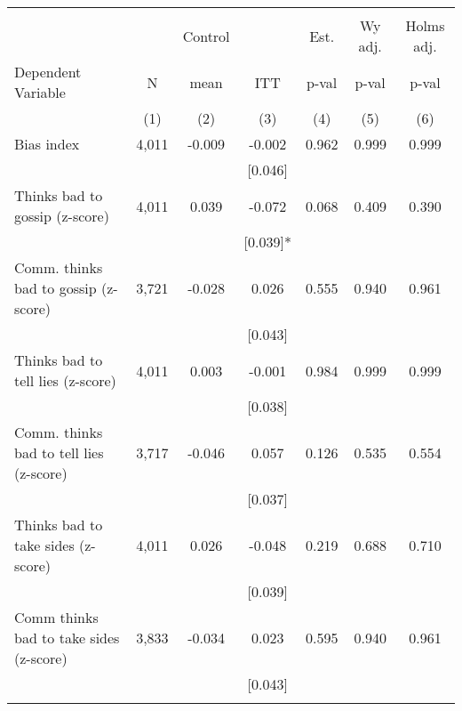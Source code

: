 \begin{tabular}{lcccccc}
\hline \noalign{\smallskip} &  &  &  &  &  & \\
 &  & Control &  & Est. & Wy adj. & Holms adj.\\
Dependent Variable & N & mean & ITT & p-val & p-val & p-val\\
 & (1) & (2) & (3) & (4) & (5) & (6)\\
\noalign{\smallskip}\hline \noalign{\smallskip}\quad Bias index & 4,011 & -0.009 & -0.002 & 0.962 & 0.999 & 0.999\\
 &  &  & [0.046] &  &  & \\
\quad Thinks bad to gossip (z-score) & 4,011 & 0.039 & -0.072 & 0.068 & 0.409 & 0.390\\
 &  &  & [0.039]* &  &  & \\
\quad Comm. thinks bad to gossip (z-score) & 3,721 & -0.028 & 0.026 & 0.555 & 0.940 & 0.961\\
 &  &  & [0.043] &  &  & \\
\quad Thinks bad to tell lies (z-score) & 4,011 & 0.003 & -0.001 & 0.984 & 0.999 & 0.999\\
 &  &  & [0.038] &  &  & \\
\quad Comm. thinks bad to tell lies (z-score) & 3,717 & -0.046 & 0.057 & 0.126 & 0.535 & 0.554\\
 &  &  & [0.037] &  &  & \\
\quad Thinks bad to take sides (z-score) & 4,011 & 0.026 & -0.048 & 0.219 & 0.688 & 0.710\\
 &  &  & [0.039] &  &  & \\
\quad Comm thinks bad to take sides (z-score) & 3,833 & -0.034 & 0.023 & 0.595 & 0.940 & 0.961\\
 &  &  & [0.043] &  &  & \\
\noalign{\smallskip}\hline\end{tabular}
